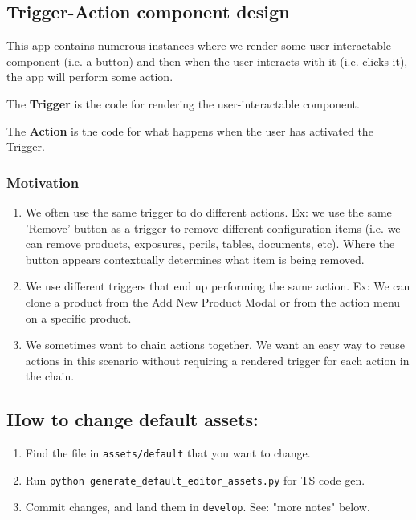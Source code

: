 \hypertarget{trigger-action-component-design}{%
\subsection{Trigger-Action component
design}\label{trigger-action-component-design}}

This app contains numerous instances where we render some
user-interactable component (i.e. a button) and then when the user
interacts with it (i.e. clicks it), the app will perform some action.

The \textbf{Trigger} is the code for rendering the user-interactable
component.

The \textbf{Action} is the code for what happens when the user has
activated the Trigger.

\hypertarget{motivation}{%
\subsubsection{Motivation}\label{motivation}}

\begin{enumerate}
\def\labelenumi{\arabic{enumi}.}
\tightlist
\item
  We often use the same trigger to do different actions. Ex: we use the
  same 'Remove' button as a trigger to remove different configuration
  items (i.e. we can remove products, exposures, perils, tables,
  documents, etc). Where the button appears contextually determines what
  item is being removed.
\item
  We use different triggers that end up performing the same action. Ex:
  We can clone a product from the Add New Product Modal or from the
  action menu on a specific product.
\item
  We sometimes want to chain actions together. We want an easy way to
  reuse actions in this scenario without requiring a rendered trigger
  for each action in the chain.
\end{enumerate}

\hypertarget{how-to-change-default-assets}{%
\subsection{How to change default
assets:}\label{how-to-change-default-assets}}

\begin{enumerate}
\def\labelenumi{\arabic{enumi}.}
\tightlist
\item
  Find the file in \texttt{assets/default} that you want to change.
\item
  Run \texttt{python\ generate\_default\_editor\_assets.py} for TS code
  gen.
\item
  Commit changes, and land them in \texttt{develop}. See: "more notes"
  below.
\end{enumerate}

